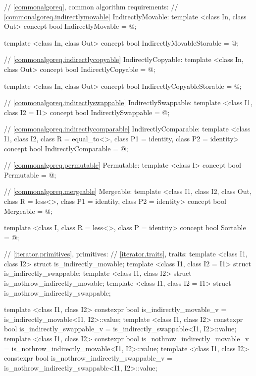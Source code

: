 \begin{codeblock}
{{{{  // \ref{commonalgoreq}, common algorithm requirements:
  // \ref{commonalgoreq.indirectlymovable} IndirectlyMovable:
  template <class In, class Out>
  concept bool IndirectlyMovable = @\seebelow@;

  template <class In, class Out>
  concept bool IndirectlyMovableStorable = @\seebelow@;

  // \ref{commonalgoreq.indirectlycopyable} IndirectlyCopyable:
  template <class In, class Out>
  concept bool IndirectlyCopyable = @\seebelow@;

  template <class In, class Out>
  concept bool IndirectlyCopyableStorable = @\seebelow@;

  // \ref{commonalgoreq.indirectlyswappable} IndirectlySwappable:
  template <class I1, class I2 = I1>
  concept bool IndirectlySwappable = @\seebelow@;

  // \ref{commonalgoreq.indirectlycomparable} IndirectlyComparable:
  template <class I1, class I2, class R = equal_to<>, class P1 = identity,
      class P2 = identity>
  concept bool IndirectlyComparable = @\seebelow@;

  // \ref{commonalgoreq.permutable} Permutable:
  template <class I>
  concept bool Permutable = @\seebelow@;

  // \ref{commonalgoreq.mergeable} Mergeable:
  template <class I1, class I2, class Out,
      class R = less<>, class P1 = identity, class P2 = identity>
  concept bool Mergeable = @\seebelow@;

  template <class I, class R = less<>, class P = identity>
  concept bool Sortable = @\seebelow@;

  // \ref{iterator.primitives}, primitives:
  // \ref{iterator.traits}, traits:
  template <class I1, class I2> struct is_indirectly_movable;
  template <class I1, class I2 = I1> struct is_indirectly_swappable;
  template <class I1, class I2> struct is_nothrow_indirectly_movable;
  template <class I1, class I2 = I1> struct is_nothrow_indirectly_swappable;

  template <class I1, class I2> constexpr bool is_indirectly_movable_v
    = is_indirectly_movable<I1, I2>::value;
  template <class I1, class I2> constexpr bool is_indirectly_swappable_v
    = is_indirectly_swappable<I1, I2>::value;
  template <class I1, class I2> constexpr bool is_nothrow_indirectly_movable_v
    = is_nothrow_indirectly_movable<I1, I2>::value;
  template <class I1, class I2> constexpr bool is_nothrow_indirectly_swappable_v
    = is_nothrow_indirectly_swappable<I1, I2>::value;

}}}}
\end{codeblock}
